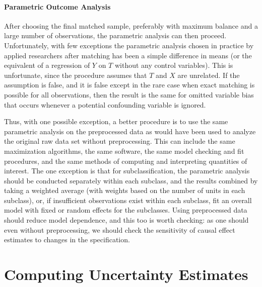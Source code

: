 \documentclass[11pt,titlepage]{article}
\begin{document}

\paragraph{Parametric Outcome Analysis}  
After choosing the final matched sample, preferably with maximum
balance and a large number of observations, the parametric analysis
can then proceed.  Unfortunately, with few exceptions the parametric
analysis chosen in practice by applied researchers after matching has
been a simple difference in means (or the equivalent of a regression
of $Y$ on $T$ without any control variables).  This is unfortunate,
since the procedure assumes that $T$ and $X$ are unrelated.  If the
assumption is false, and it is false except in the rare case when
exact matching is possible for all observations, then the result is
the same for omitted variable bias that occurs whenever a potential
confounding variable is ignored.

Thus, with one possible exception, a better procedure is to use the
same parametric analysis on the preprocessed data as would have been
used to analyze the original raw data set without preprocessing.  This
can include the same maximization algorithms, the same software, the
same model checking and fit procedures, and the same methods of
computing and interpreting quantities of interest.  The one exception
is that for subclassification, the parametric analysis should be
conducted separately within each subclass, and the results combined by
taking a weighted average (with weights based on the number of units
in each subclass), or, if insufficient observations exist within each
subclass, fit an overall model with fixed or random effects for the
subclasses.  Using preprocessed data should reduce model dependence,
and this too is worth checking: as one should even without
preprocessing, we should check the sensitivity of causal effect
estimates to changes in the specification.

\section{Computing Uncertainty Estimates}
\end{document}
